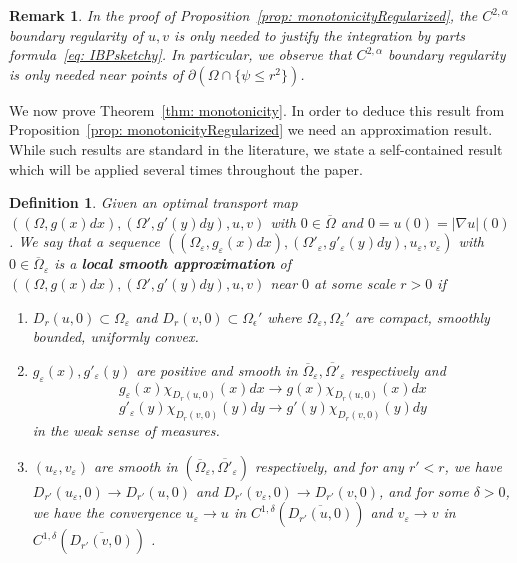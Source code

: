 \documentclass[12pt,reqno]{amsart}
\newtheorem{defn}{Definition}[section]
\newtheorem{remark}{Remark}[section]
\newcommand{\del}{\partial}
\newcommand{\eps}{\varepsilon}
\numberwithin{equation}{section}
\begin{document}
\begin{remark}\label{rk: regularityIBP}
In the proof of Proposition~\ref{prop: monotonicityRegularized}, the $C^{2,\alpha}$ boundary regularity of $u,v$ is only needed to justify the integration by parts formula~\eqref{eq: IBPsketchy}.  In particular, we observe that $C^{2,\alpha}$ boundary regularity is only needed near points of $\del (\Omega \cap \{\psi \leq r^2\})$.
\end{remark}

We now prove Theorem~\ref{thm: monotonicity}.  In order to deduce this result from Proposition~\ref{prop: monotonicityRegularized} we need an approximation result.  While such results are standard in the literature, we state a self-contained result which will be applied several times throughout the paper.

\begin{defn}\label{defn: localSmoothApprox}
    Given an optimal transport map $((\Omega, g(x)dx), (\Omega', g'(y)dy), u, v)$ with $0\in \overline{\Omega}$ and $0 = u(0) = |\nabla u|(0)$. We say that a sequence $((\Omega_{\eps}, g_{\eps}(x)dx), (\Omega'_{\eps}, g'_{\eps}(y)dy), u_{\eps}, v_{\eps})$ with $0\in \overline{\Omega}_{\eps}$  is a {\bf local smooth approximation} of $((\Omega, g(x)dx), (\Omega', g'(y)dy), u, v)$ near $0$ at some scale $r>0$ if
    \begin{enumerate}
        \item $D_r(u,0)\subset \Omega_{\eps}$ and $D_r(v,0)\subset \Omega_{\epsilon}'$ where $\Omega_{\eps}, \Omega_{\eps}'$ are compact, smoothly bounded, uniformly convex. 
        \item $g_{\eps}(x), g'_{\eps}(y)$ are positive and smooth in $\overline\Omega_{\eps}, \overline{\Omega'}_{\eps}$ respectively and 
        \[g_{\eps}(x)\chi_{D_r(u, 0)}(x)dx\to g(x)\chi_{D_r(u, 0)}(x)dx\]  
        \[g'_{\eps}(y)\chi_{D_r(v, 0)}(y)dy\to g'(y)\chi_{D_r(v, 0)}(y)dy\]
        in the weak sense of measures.  
        \item $(u_{\eps}, v_{\eps})$ are smooth in $(\overline \Omega_{\eps}, \overline{\Omega'}_{\eps})$ respectively, and for any $r'<r$, we have $D_{r'}(u_{\eps}, 0)\to D_{r'}(u, 0)$ and $D_{r'}(v_{\eps}, 0)\to D_{r'}(v, 0)$, and for some $\delta>0$, we have the convergence $ u_{\eps}\to  u$ in $C^{1, \delta}(\overline{D_{r'}(u, 0)})$ and $ v_{\eps}\to v$ in $C^{1, \delta}(\overline{D_{r'}(v, 0)})$ . 
    \end{enumerate}
\end{defn}
\end{document}
